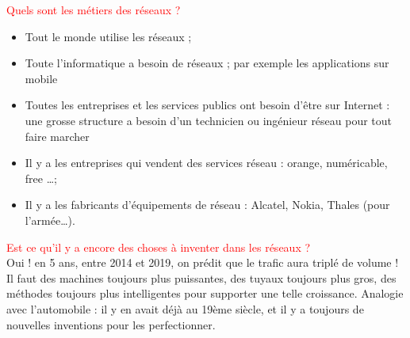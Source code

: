 \documentclass[10pt,a4paper]{article}
\newcommand{\question}[2]{\noindent \textcolor{red}{#1}\\ #2}
\begin{document}
\question{Quels sont les métiers des réseaux ?}{\begin{itemize}
    \item Tout le monde utilise les réseaux ;
    \item Toute l’informatique a besoin de réseaux ; par exemple les
      applications sur mobile
    \item Toutes les entreprises et les services publics ont besoin d’être sur
      Internet : une grosse structure a besoin d’un technicien ou ingénieur
      réseau pour tout faire marcher
    \item Il y a les entreprises qui vendent des services réseau : orange,
      numéricable, free \dots ;
    \item Il y a les fabricants d’équipements de réseau : Alcatel, Nokia,
      Thales (pour l’armée…).
  \end{itemize}
}

\question{Est ce qu’il y a encore des choses à inventer dans les réseaux ?}{Oui
  ! en 5 ans, entre 2014 et 2019, on prédit que le trafic aura triplé de volume
  ! Il faut des machines toujours plus puissantes, des tuyaux toujours plus
  gros, des méthodes toujours plus intelligentes pour supporter une telle
croissance. Analogie avec l’automobile : il y en avait déjà au 19ème siècle, et
il y a toujours de nouvelles inventions pour les perfectionner.}
\end{document}
